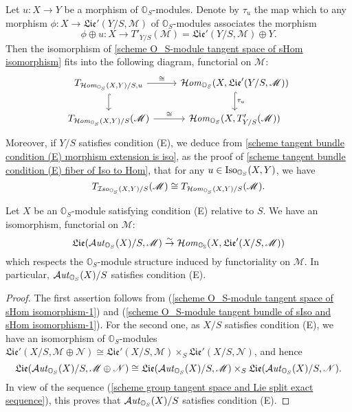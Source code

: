 \begin{remark}\label{scheme O_S-module tangent bundle of sIso and sHom isomorphism}
Let $u:X\to Y$ be a morphism of $\mathbb{O}_S$-modules. Denote by $\tau_u$ the map which to any morphism $\phi:X\to\mathfrak{Lie}'(Y/S,\mathscr{M})$ of $\mathbb{O}_S$-modules associates the morphism
\[\phi\oplus u:X\to T'_{Y/S}(\mathscr{M})=\mathfrak{Lie}'(Y/S,\mathscr{M})\oplus Y.\]
Then the isomorphism of \cref{scheme O_S-module tangent space of sHom isomorphism} fits into the following diagram, functorial on $\mathscr{M}$:
\[\begin{tikzcd}
T_{\sHom_{\mathbb{O}_S}(X,Y)/S,u}\ar[r,"\cong"]\ar[d,hook]&\sHom_{\mathbb{O}_S}(X,\mathfrak{Lie}'(Y/S,\mathscr{M}))\ar[d,hook,"\tau_u"]\\
T_{\sHom_{\mathbb{O}_S}(X,Y)/S}(\mathscr{M})\ar[r,"\cong"]&\sHom_{\mathbb{O}_S}(X,T'_{Y/S}(\mathscr{M}))
\end{tikzcd}\]
Moreover, if $Y/S$ satisfies condition (E), we deduce from \cref{scheme tangent bundle condition (E) morphism extension is iso}, as the proof of \cref{scheme tangent bundle condition (E) fiber of Iso to Hom}, that for any $u\in\mathrm{Iso}_{\mathbb{O}_S}(X,Y)$, we have
\begin{equation}\label{scheme O_S-module tangent bundle of sIso and sHom isomorphism-1}
T_{\operatorname{\mathcal{I}\hspace*{-0.5pt}\textit{so}\hspace{0.5pt}}_{\mathbb{O}_S}(X,Y)/S}(\mathscr{M})\cong T_{\operatorname{\mathcal{H}\hspace*{-0.4pt}\textit{om}\hspace{0.5pt}}_{\mathbb{O}_S}(X,Y)/S}(\mathscr{M}).
\end{equation}
\end{remark}

\begin{corollary}\label{scheme O_S-module condition (E) Lie of sAut isomorphism}
Let $X$ be an $\mathbb{O}_S$-module satisfying condition (E) relative to $S$. We have an isomorphism, functorial on $\mathscr{M}$:
\[\mathfrak{Lie}(\operatorname{\mathcal{A}\hspace*{-0.2pt}\textit{ut}\hspace{0.5pt}}_{\mathbb{O}_S}(X)/S,\mathscr{M})\stackrel{\sim}{\to} \operatorname{\mathcal{H}\hspace*{-0.4pt}\textit{om}\hspace{0.5pt}}_{\mathbb{O_S}}(X,\mathfrak{Lie}'(X/S,\mathscr{M}))\]
which respects the $\mathbb{O}_S$-module structure induced by functoriality on $\mathscr{M}$. In particular, $\operatorname{\mathcal{A}\hspace*{-0.2pt}\textit{ut}\hspace{0.5pt}}_{\mathbb{O}_S}(X)/S$ satisfies condition (E).
\end{corollary}
\begin{proof}
The first assertion follows from (\ref{scheme O_S-module tangent space of sHom isomorphism-1}) and (\ref{scheme O_S-module tangent bundle of sIso and sHom isomorphism-1}). For the second one, as $X/S$ satisfies condition (E), we have an isomorphism of $\mathbb{O}_S$-modules $\mathfrak{Lie}'(X/S,\mathscr{M}\oplus\mathscr{N})\cong \mathfrak{Lie}'(X/S,\mathscr{M})\times_S\mathfrak{Lie}'(X/S,\mathscr{N})$, and hence
\[\mathfrak{Lie}(\operatorname{\mathcal{A}\hspace*{-0.2pt}\textit{ut}\hspace{0.5pt}}_{\mathbb{O}_S}(X)/S,\mathscr{M}\oplus\mathscr{N})\cong\mathfrak{Lie}(\operatorname{\mathcal{A}\hspace*{-0.2pt}\textit{ut}\hspace{0.5pt}}_{\mathbb{O}_S}(X)/S,\mathscr{M})\times_S\mathfrak{Lie}(\operatorname{\mathcal{A}\hspace*{-0.2pt}\textit{ut}\hspace{0.5pt}}_{\mathbb{O}_S}(X)/S,\mathscr{N}).\]
In view of the sequence (\ref{scheme group tangent space and Lie split exact sequence}), this proves that $\operatorname{\mathcal{A}\hspace*{-0.2pt}\textit{ut}\hspace{0.5pt}}_{\mathbb{O}_S}(X)/S$ satisfies condition (E).
\end{proof}


